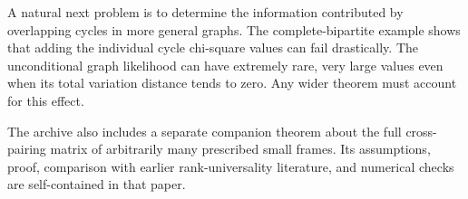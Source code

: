 A natural next problem is to determine the information contributed by overlapping
cycles in more general graphs. The complete-bipartite example shows that adding
the individual cycle chi-square values can fail drastically. The unconditional
graph likelihood can have extremely rare, very large values even when its total
variation distance tends to zero. Any wider theorem must account for this effect.

The archive also includes a separate companion theorem about the full
cross-pairing matrix of arbitrarily many prescribed small frames. Its assumptions,
proof, comparison with earlier rank-universality literature, and numerical
checks are self-contained in that paper.

